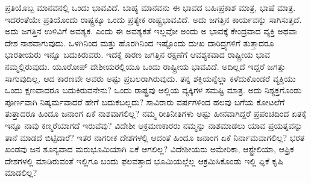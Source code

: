 ಪ್ರತಿಯೊಬ್ಬ ಮಾನವನಲ್ಲಿ ಒಂದು ಭಾವವಿದೆ. ಬಾಹ್ಯ ಮಾನವನು ಈ ಭಾವದ ಬಹಿಃಪ್ರಕಾಶ ಮಾತ್ರ, ಭಾಷೆ ಮಾತ್ರ. ಇದರಂತೆಯೇ ಪ್ರತಿಯೊಂದು ರಾಷ್ಟ್ರಕ್ಕೂ ಒಂದು ಪ್ರತ್ಯೇಕ ರಾಷ್ಟ್ರಭಾವವಿದೆ. ಅದು ಜಗತ್ತಿನ ಕಾರ್ಯವನ್ನು ಸಾಗಿಸುತ್ತದೆ. ಅದು ಜಗತ್ತಿನ ಉಳಿವಿಗೆ ಅವಶ್ಯಕ. ಎಂದು ಈ ಅವಶ್ಯಕತೆ ಇಲ್ಲವೋ ಅಂದು ಅ ಭಾವಕ್ಕೆ ಕೇಂದ್ರವಾದ ವ್ಯಕ್ತಿ ಅಥವಾ ದೇಶ ನಾಶವಾಗುವುದು. ಒಳಗಿನಿಂದ ಮತ್ತು ಹೊರಗಿನಿಂದ ಇಷ್ಟೊಂದು ದುಃಖ ದಾರಿದ್ರ್ಯಗಳಿಗೆ ತುತ್ತಾದರೂ ಭಾರತೀಯರು ಇನ್ನೂ ಬದುಕಿರುವರು. ಇದಕ್ಕೆ ಕಾರಣ ಜಗತ್ತಿನ ರಕ್ಷಣೆಗೆ ಆವಶ್ಯಕವಾದ ರಾಷ್ಟ್ರೀಯ ಭಾವ ನಮ್ಮಲ್ಲಿರುವುದು. ಯೂರೋಪ್​ ದೇಶೀಯರಲ್ಲಿಯೂ ಒಂದು ರಾಷ್ಟ್ರೀಯ ಭಾವವಿದೆ. ಅದಿಲ್ಲದೆ ಇದ್ದರೆ ಜಗತ್ತು ಸಾಗುವುದಿಲ್ಲ. ಆದ ಕಾರಣವೇ ಅವರು ಅಷ್ಟು ಪ್ರಬಲರಾಗಿರುವುದು. ತನ್ನ ಶಕ್ತಿಯನ್ನೆಲ್ಲಾ ಕಳೆದುಕೊಂಡರೆ ವ್ಯಕ್ತಿಯು ಒಂದು ಕ್ಷಣವಾದರೂ ಬದುಕಿರುವನೇನು? ಒಂದು ರಾಷ್ಟ್ರವು ಅಲ್ಲಿಯ ವ್ಯಕ್ಕಿಗಳ ಸಮಷ್ಟಿ ಮಾತ್ರ. ಅದು ನಿಶ್ಯಕ್ತಗೊಂಡು ಪೂರ್ಣವಾಗಿ ನಿಷ್ಕರ್ಮವಾದರೆ ಹೇಗೆ ಬದುಕಬಲ್ಲದು? ಸಾವಿರಾರು ವರ್ಷಗಳಿಂದ ಹಲವು ಬಗೆಯ ಕೋಟಲೆಗೆ ತುತ್ತಾದರೂ ಹಿಂದೂ ಜನಾಂಗ ಏಕೆ ನಾಶವಾಗಲಿಲ್ಲ? ನಮ್ಮ ರೀತಿನೀತಿಗಳು ಅಷ್ಟು ಹೀನವಾಗಿದ್ದರೆ ಪ್ರಪಂಚದಿಂದ ಏತಕ್ಕೆ ಇನ್ನೂ ನಾವು ಕಣ್ಮರೆಯಾಗದೆ ಇರುವೆವು? ವಿದೇಶೀ ಆಕ್ರಮಣಕಾರರು ನಮ್ಮನ್ನು ನಾಶಮಾಡಲು ಯಾವ ಪ್ರಯತ್ನವನ್ನು ತಾನೆ ಮಾಡದೆ ಬಿಟ್ಟಿದಾರೆ? ಇತರ ನಾಗರೀಕ ದೇಶಗಳಲ್ಲಿ ಆದಂತೆ ಹಿಂದೂ ಜನಾಂಗ ಏಕೆ ನಿರ್ನಾಮವಾಗಲಿಲ್ಲ? ಭರತ ಖಂಡವು ಜನ ಶೂನ್ಯವಾದ ಮರುಭೂಮಿಯಾಗಿ ಏಕೆ ಆಗಲಿಲ್ಲ? ವಿದೇಶೀಯರು ಅಮೇರಿಕಾ, ಆಸ್ಟ್ರೇಲಿಯಾ, ಆಫ್ರಿಕ ದೇಶಗಳಲ್ಲಿ ಮಾಡಿರುವಂತೆ ಇಲ್ಲಿಗೂ ಬಂದು ಫಲವತ್ತಾದ ಭೂಮಿಯಲ್ಲೆಲ್ಲ ಆಕ್ರಮಿಸಿಕೊಂಡು ಇಲ್ಲಿ ಏ್ಧಕೆ ಕೃಷಿ ಮಾಡಲಿಲ್ಲ?

